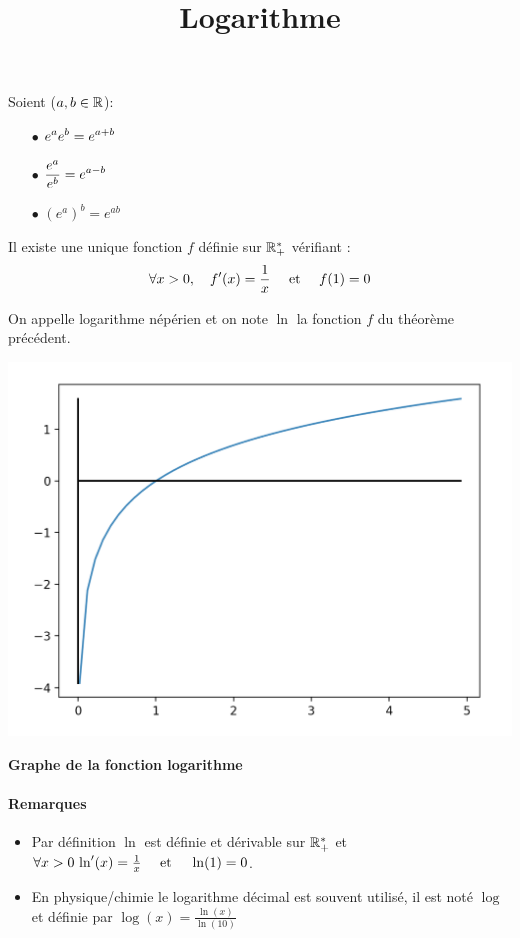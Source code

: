 \documentclass[a4paper, 11pt]{article}
\begin{document}
\begin{prop}
Soient ($a, b\in \mathbb{R}$):
\begin{itemize}
\item[$\bullet$] $\displaystyle e^{a}e^{b}=e^{a+b}$
\item[$\bullet$] $\displaystyle\frac{e^{a}}{e^{b}}=e^{a-b}$
\item[$\bullet$] $(e^{a})^b=e^{ab}$
\end{itemize}
\end{prop}




\newpage

\title{Logarithme}


\begin{theorem}
Il existe une unique fonction $f$ définie sur $\mathbb{R}_+^*$ vérifiant : 
$$\forall x>0,\quad f'(x) =\frac{1}{x} \quad \text{ et } \quad f(1)=0$$
\end{theorem}

\begin{defi}
On appelle logarithme népérien et on note $\ln$ la fonction $f$ du théorème précédent. 
\end{defi}



\begin{center}
\includegraphics[scale=0.3]{CH0 - Calculs/images/ln.png}\par\medskip
    \textbf{Graphe de la fonction logarithme}
\end{center}
\paragraph{Remarques}
\begin{itemize}
    \item Par définition $\ln$ est définie et dérivable sur $\mathbb{R}_+^*$ et 
    $\forall x>0\, \ln'(x) =\frac{1}{x}  \quad \text{ et } \quad \ln(1)=0$.
    \item En physique/chimie le logarithme décimal est souvent utilisé, il est noté $\log$ et définie par $\log(x)  =\frac{\ln(x)}{\ln(10)}$

\end{itemize}
\end{document}
